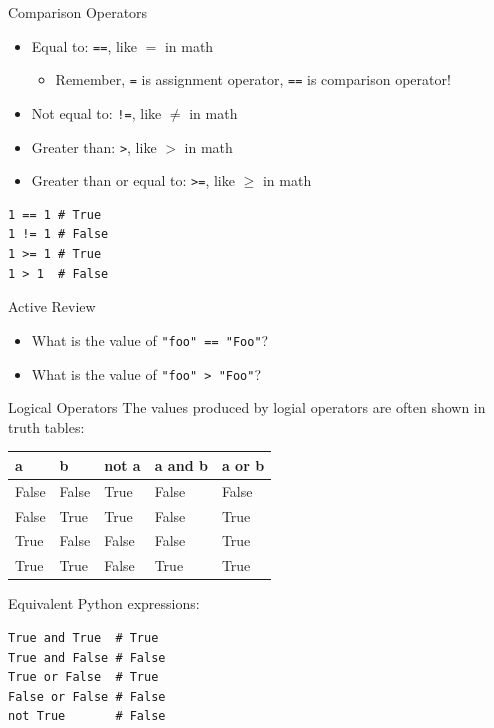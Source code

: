 \documentclass[smaller, aspectratio=1610]{beamer}
\begin{document}
\begin{frame}[label={sec:orga1e3eef},fragile]{Comparison Operators}
 \begin{itemize}
\item Equal to: \texttt{==}, like \(=\) in math

\begin{itemize}
\item Remember, \texttt{=} is assignment operator, \texttt{==} is comparison operator!
\end{itemize}

\item Not equal to: \texttt{!=}, like \(\ne\) in math
\item Greater than: \texttt{>}, like \(>\) in math
\item Greater than or equal to: \texttt{>=}, like \(\ge\) in math
\end{itemize}

\lstset{language=Python,label= ,caption= ,captionpos=b,numbers=none}
\begin{lstlisting}
1 == 1 # True
1 != 1 # False
1 >= 1 # True
1 > 1  # False
\end{lstlisting}

\begin{block}{Active Review}
\begin{itemize}
\item What is the value of \texttt{"foo" == "Foo"}?
\item What is the value of \texttt{"foo" > "Foo"}?
\end{itemize}
\end{block}
\end{frame}

\begin{frame}[label={sec:org68cfb82},fragile]{Logical Operators}
 The values produced by logial operators are often shown in truth tables:

\begin{center}
\begin{tabular}{|l|l|l|l|l|}
\hline
a & b & not a & a and b & a or b \\
\hline
False & False & True & False & False \\
False & True & True & False & True \\
True & False & False & False & True \\
True & True & False & True & True \\
\hline
\end{tabular}
\end{center}

Equivalent Python expressions:

\lstset{language=Python,label= ,caption= ,captionpos=b,numbers=none}
\begin{lstlisting}
True and True  # True
True and False # False
True or False  # True
False or False # False
not True       # False
\end{lstlisting}
\end{frame}
\end{document}
